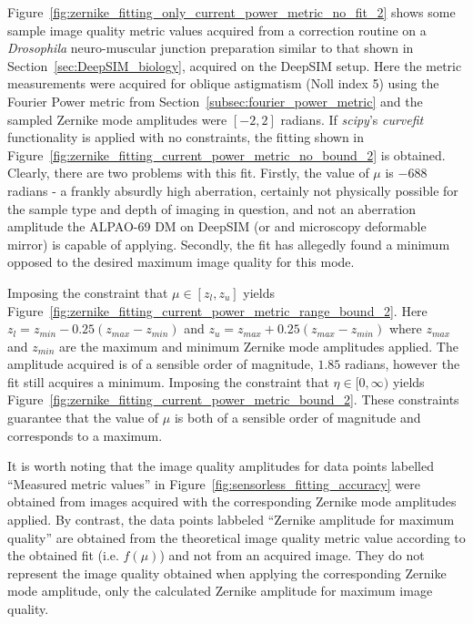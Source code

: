 Figure~\ref{fig:zernike_fitting_only_current_power_metric_no_fit_2} shows 
some sample image quality metric values acquired from a correction routine 
on a \textit{Drosophila} neuro-muscular junction preparation similar to 
that shown in Section~\ref{sec:DeepSIM_biology}, acquired on the DeepSIM 
setup. Here the metric measurements were acquired for oblique astigmatism 
(Noll index 5) using the Fourier Power metric from 
Section~\ref{subsec:fourier_power_metric} and the sampled Zernike mode 
amplitudes were $[-2,2]$ radians. If \textit{scipy}'s 
\textit{curve\textunderscore fit} functionality is applied with no 
constraints, the fitting shown in 
Figure~\ref{fig:zernike_fitting_current_power_metric_no_bound_2} is 
obtained. Clearly, there are two problems with this fit. Firstly, the value 
of $\mu$ is $-688$ radians - a frankly absurdly high aberration, certainly 
not physically possible for the sample type and depth of imaging in 
question, and not an aberration amplitude the ALPAO-69 DM on DeepSIM (or and 
microscopy deformable mirror) is capable of applying. Secondly, the fit has 
allegedly found a minimum opposed to the desired maximum image quality for 
this mode. 

Imposing the constraint that $\mu \in [z_{l}, z_{u}]$ yields 
Figure~\ref{fig:zernike_fitting_current_power_metric_range_bound_2}. Here 
$z_{l} = z_{min} - 0.25(z_{max}-z_{min})$ and $z_{u} = z_{max} + 
0.25(z_{max}-z_{min})$ where $z_{max}$ and $z_{min}$ are the maximum and 
minimum Zernike mode amplitudes applied. The amplitude acquired is of a 
sensible order of magnitude, $1.85$ radians, however the fit still acquires 
a minimum. Imposing the constraint that $\eta \in [0, \infty)$ 
yields Figure~\ref{fig:zernike_fitting_current_power_metric_bound_2}. These 
constraints guarantee that the value of $\mu$ is both of a sensible 
order of magnitude and corresponds to a maximum. 

It is worth noting that the image quality amplitudes for data points labelled 
``Measured metric values'' in Figure~\ref{fig:sensorless_fitting_accuracy} 
were obtained from images acquired with the corresponding Zernike mode 
amplitudes applied. By contrast, the data points labbeled ``Zernike amplitude 
for maximum quality'' are obtained from the theoretical image quality metric 
value according to the obtained fit (i.e. $f(\mu)$) and not from an acquired 
image. They do not represent the image quality obtained when applying the 
corresponding Zernike mode amplitude, only the calculated Zernike amplitude 
for maximum image quality.

